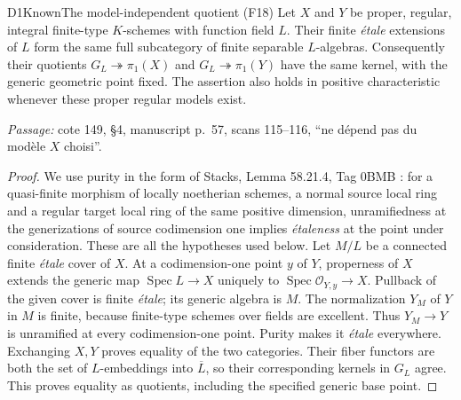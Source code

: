 \begin{result}{D1}{Known}{The model-independent quotient (F18)}
Let $X$ and $Y$ be proper, regular, integral finite-type $K$-schemes with function field $L$. Their finite \emph{\'etale} extensions of $L$ form the same full subcategory of finite separable $L$-algebras. Consequently their quotients $G_L\twoheadrightarrow\pi_1(X)$ and $G_L\twoheadrightarrow\pi_1(Y)$ have the same kernel, with the generic geometric point fixed. The assertion also holds in positive characteristic whenever these proper regular models exist.
\par\emph{Passage:} cote 149, \S4, manuscript p.~57, scans 115--116, ``ne d\'epend pas du mod\`ele $X$ choisi''.
\end{result}
\begin{proof}
We use purity in the form of Stacks, Lemma 58.21.4, Tag 0BMB \cite{DE_StacksPurity}: for a quasi-finite morphism of locally noetherian schemes, a normal source local ring and a regular target local ring of the same positive dimension, unramifiedness at the generizations of source codimension one implies \emph{\'etaleness} at the point under consideration. These are all the hypotheses used below.
Let $M/L$ be a connected finite \emph{\'etale} cover of $X$. At a codimension-one point $y$ of $Y$, properness of $X$ extends the generic map $\operatorname{Spec}L\to X$ uniquely to $\operatorname{Spec}\mathcal O_{Y,y}\to X$. Pullback of the given cover is finite \emph{\'etale}; its generic algebra is $M$. The normalization $Y_M$ of $Y$ in $M$ is finite, because finite-type schemes over fields are excellent. Thus $Y_M\to Y$ is unramified at every codimension-one point. Purity makes it \emph{\'etale} everywhere. Exchanging $X,Y$ proves equality of the two categories. Their fiber functors are both the set of $L$-embeddings into $\overline L$, so their corresponding kernels in $G_L$ agree. This proves equality as quotients, including the specified generic base point.
\end{proof}

